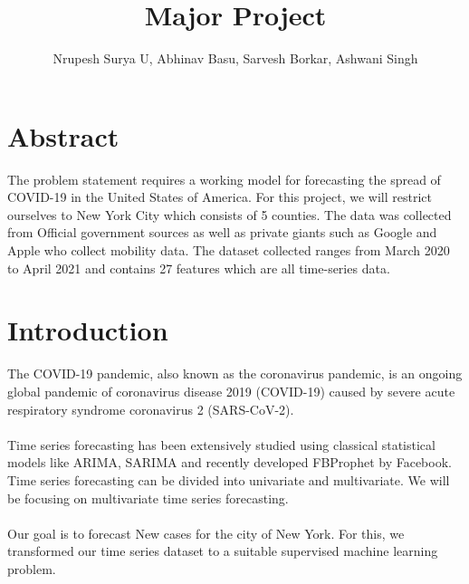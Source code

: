 \documentclass[12pt,a4paper]{article}
\begin{document}
\large
\title{Major Project}
\maketitle
\author{Nrupesh Surya U, Abhinav Basu, Sarvesh Borkar, Ashwani Singh}


\section*{Abstract}
The problem statement requires a working model for forecasting
the spread of COVID-19 in the United States of America. For this 
project, we will restrict ourselves to New York City which consists of 
5 counties. The data was collected from Official government sources 
as well as private giants such as Google and Apple who collect mobility
data. The dataset collected ranges from March 2020 to April 2021 and contains
27 features which are all time-series data.   
\section*{Introduction}
The COVID-19 pandemic, also known as the coronavirus pandemic, is an ongoing global pandemic of coronavirus disease 2019 (COVID-19) caused by severe acute respiratory syndrome coronavirus 2 (SARS-CoV-2).
\\\\
Time series forecasting has been extensively studied using classical 
statistical models like ARIMA, SARIMA and recently developed FBProphet by Facebook.
\\
Time series forecasting can be divided into univariate and multivariate. We will
be focusing on multivariate time series forecasting. 
\\\\
Our goal is to forecast New cases for the city of New York. For this, we transformed our 
time series dataset to a suitable supervised machine learning problem. 
\end{document}

